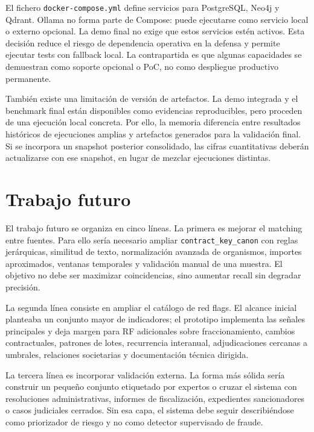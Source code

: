 \documentclass[11pt,a4paper,spanish]{book}
\numberwithin{equation}{chapter}
\numberwithin{figure}{chapter}
\begin{document}
El fichero \texttt{docker-compose.yml} define servicios para PostgreSQL, Neo4j y Qdrant. Ollama no
forma parte de Compose: puede ejecutarse como servicio local o externo opcional. La demo final no
exige que estos servicios est{\'e}n activos. Esta decisi{\'o}n
reduce el riesgo de dependencia operativa en la defensa y permite ejecutar tests con fallback local.
La contrapartida es que algunas capacidades se demuestran como soporte opcional o PoC, no como
despliegue productivo permanente.

Tambi{\'e}n existe una limitaci{\'o}n de versi{\'o}n de artefactos. La demo integrada y el benchmark final
est{\'a}n disponibles como evidencias reproducibles, pero proceden de una ejecuci{\'o}n local concreta.
Por ello, la memoria diferencia entre resultados hist{\'o}ricos de ejecuciones amplias y artefactos
generados para la validaci{\'o}n final. Si se incorpora un snapshot posterior consolidado, las cifras
cuantitativas deber{\'a}n actualizarse con ese snapshot, en lugar de mezclar ejecuciones distintas.

\section{Trabajo futuro}
\label{sec:trabajo_futuro}

El trabajo futuro se organiza en cinco l{\'i}neas. La primera es mejorar el matching entre fuentes.
Para ello ser{\'i}a necesario ampliar \texttt{contract\_key\_canon} con reglas jer{\'a}rquicas, similitud
de texto, normalizaci{\'o}n avanzada de organismos, importes aproximados, ventanas temporales y
validaci{\'o}n manual de una muestra. El objetivo no debe ser maximizar coincidencias, sino aumentar
recall sin degradar precisi{\'o}n.

La segunda l{\'i}nea consiste en ampliar el cat{\'a}logo de red flags. El alcance inicial planteaba
un conjunto mayor de indicadores; el prototipo implementa las se{\~n}ales principales y deja margen para
RF adicionales sobre fraccionamiento, cambios contractuales, patrones de lotes, recurrencia
interanual, adjudicaciones cercanas a umbrales, relaciones societarias y documentaci{\'o}n t{\'e}cnica
dirigida.

La tercera l{\'i}nea es incorporar validaci{\'o}n externa. La forma m{\'a}s s{\'o}lida ser{\'i}a construir
un peque{\~n}o conjunto etiquetado por expertos o cruzar el sistema con resoluciones administrativas,
informes de fiscalizaci{\'o}n, expedientes sancionadores o casos judiciales cerrados. Sin esa capa,
el sistema debe seguir describi{\'e}ndose como priorizador de riesgo y no como detector supervisado de
fraude.
\end{document}
